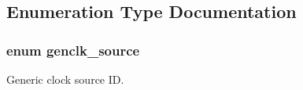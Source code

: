 \subsection{\-Enumeration \-Type \-Documentation}
\hypertarget{group__genclk__group_gaca55f4f4f96549b8111139d144bce01c}{
\subsubsection[{genclk\-\_\-source}]{\setlength{\rightskip}{0pt plus 5cm}enum {\bf genclk\-\_\-source}}}
\label{group__genclk__group_gaca55f4f4f96549b8111139d144bce01c}


\-Generic clock source \-I\-D. 


